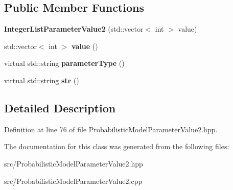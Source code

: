 \subsection*{Public Member Functions}
\begin{DoxyCompactItemize}
\item 
\mbox{\label{classtops_1_1IntegerListParameterValue2_a7f632924ef354cb5ba95c93a48555b63}} 
{\bfseries Integer\+List\+Parameter\+Value2} (std\+::vector$<$ int $>$ value)
\item 
\mbox{\label{classtops_1_1IntegerListParameterValue2_ad3b25a53f7abb2f8967fa6bd98e66da0}} 
std\+::vector$<$ int $>$ {\bfseries value} ()
\item 
\mbox{\label{classtops_1_1IntegerListParameterValue2_a7761fcec6c659b41b04c6d1cb3b067b6}} 
virtual std\+::string {\bfseries parameter\+Type} ()
\item 
\mbox{\label{classtops_1_1IntegerListParameterValue2_a704f39233a429a36b37cf01688237c6c}} 
virtual std\+::string {\bfseries str} ()
\end{DoxyCompactItemize}


\subsection{Detailed Description}


Definition at line 76 of file Probabilistic\+Model\+Parameter\+Value2.\+hpp.



The documentation for this class was generated from the following files\+:\begin{DoxyCompactItemize}
\item 
src/Probabilistic\+Model\+Parameter\+Value2.\+hpp\item 
src/Probabilistic\+Model\+Parameter\+Value2.\+cpp\end{DoxyCompactItemize}

